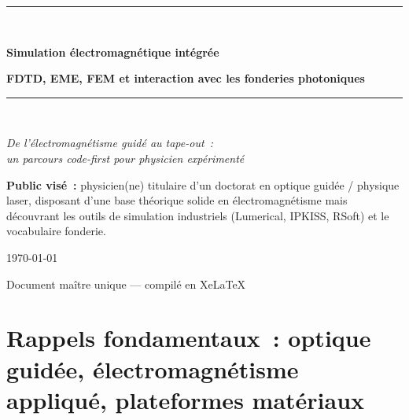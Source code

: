 \documentclass[11pt,twoside,openright]{book}
\begin{document}
\begin{titlepage}
  \centering
  \vspace*{2cm}

  {\color{coursbleu}\rule{\textwidth}{1.5pt}}\\[0.4cm]
  {\Huge\bfseries\color{coursbleu} Simulation électromagnétique intégrée\par}
  \vspace{0.3cm}
  {\Large\bfseries\color{coursbleuclair} FDTD, EME, FEM et interaction avec les fonderies photoniques\par}
  \vspace{0.4cm}
  {\color{coursbleu}\rule{\textwidth}{1.5pt}}\\[1.2cm]

  {\large\itshape De l'électromagnétisme guidé au tape-out~:\\
   un parcours code-first pour physicien expérimenté\par}

  \vspace{2.5cm}
  \begin{tcolorbox}[base,colback=coursbleu!5,colframe=coursbleu,width=0.75\textwidth]
    \textbf{Public visé~:} physicien(ne) titulaire d'un doctorat en optique
    guidée / physique laser, disposant d'une base théorique solide en
    électromagnétisme mais découvrant les outils de simulation industriels
    (Lumerical, IPKISS, RSoft) et le vocabulaire fonderie.
  \end{tcolorbox}

  \vfill

  {\large\today\par}
  \vspace{0.5cm}
  {\normalsize Document maître unique — compilé en XeLaTeX\par}
\end{titlepage}

\frontmatter

\tableofcontents

\mainmatter

\part{Rappels fondamentaux~: optique guidée, électromagnétisme appliqué, plateformes matériaux}
\label{part:module0}

\end{document}
